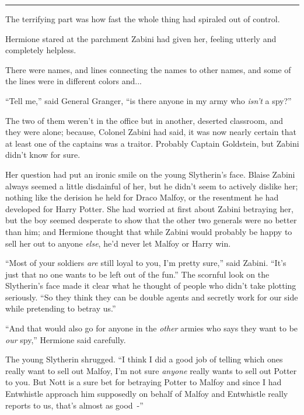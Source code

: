 \begin{center}\rule{3in}{0.4pt}\end{center}

The terrifying part was how fast the whole thing had spiraled out of control.

Hermione stared at the parchment Zabini had given her, feeling utterly and completely helpless.

There were names, and lines connecting the names to other names, and some of the lines were in different colors and...

``Tell me,'' said General Granger, ``is there anyone in my army who \emph{isn't} a spy?''

The two of them weren't in the office but in another, deserted classroom, and they were alone; because, Colonel Zabini had said, it was now nearly certain that at least one of the captains was a traitor. Probably Captain Goldstein, but Zabini didn't know for sure.

Her question had put an ironic smile on the young Slytherin's face. Blaise Zabini always seemed a little disdainful of her, but he didn't seem to actively dislike her; nothing like the derision he held for Draco Malfoy, or the resentment he had developed for Harry Potter. She had worried at first about Zabini betraying her, but the boy seemed desperate to show that the other two generals were no better than him; and Hermione thought that while Zabini would probably be happy to sell her out to anyone \emph{else}, he'd never let Malfoy or Harry win.

``Most of your soldiers \emph{are} still loyal to you, I'm pretty sure,'' said Zabini. ``It's just that no one wants to be left out of the fun.'' The scornful look on the Slytherin's face made it clear what he thought of people who didn't take plotting seriously. ``So they think they can be double agents and secretly work for our side while pretending to betray us.''

``And that would also go for anyone in the \emph{other} armies who says they want to be \emph{our} spy,'' Hermione said carefully.

The young Slytherin shrugged. ``I think I did a good job of telling which ones really want to sell out Malfoy, I'm not sure \emph{anyone} really wants to sell out Potter to you. But Nott is a sure bet for betraying Potter to Malfoy and since I had Entwhistle approach him supposedly on behalf of Malfoy and Entwhistle really reports to us, that's almost as good~-''

